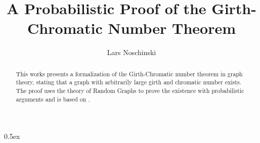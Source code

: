 \documentclass[11pt,a4paper]{article}
\begin{document}
\title{A Probabilistic Proof of the Girth-Chromatic Number Theorem}
\author{Lars Noschinski}
\maketitle

\begin{abstract}
    This works presents a formalization of the Girth-Chromatic number theorem
    in graph theory, stating that a graph with arbitrarily large girth and
    chromatic number exists. The proof uses the theory of Random Graphs to
    prove the existence with probabilistic arguments and is based on
    \cite{diestel2010graph}.
\end{abstract}

\tableofcontents

\parindent 0pt\parskip 0.5ex

%






\end{document}
